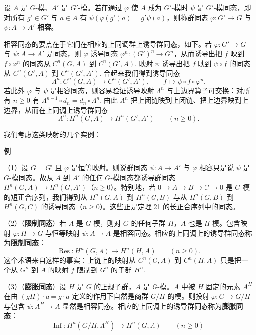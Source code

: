 \begin{definition}
设 \(A\) 是 \(G\)-模、\(A'\) 是 \(G'\)-模。若在通过 \(\varphi\) 使 \(A\) 成为 \(G'\)-模时 \(\psi\) 是 \(G'\)-模同态，即对所有 \(g' \in G'\) 与 \(a \in A\) 有 \(\psi(\varphi(g')a) = g'\psi(a)\)，则称群同态 \(\varphi : G' \to G\) 与 \(\psi : A \to A'\) \textbf{相容}。
\end{definition}

相容同态的要点在于它们在相应的上同调群上诱导群同态，如下。若 \(\varphi : G' \to G\) 与 \(\psi : A \to A'\) 是同态，则 \(\varphi\) 诱导同态 \(\varphi^n : (G')^n \to G^n\)，从而诱导出把 \(f\) 映到 \(f \circ \varphi^n\) 的同态从 \(C^n(G, A)\) 到 \(C^n(G', A)\). 映射 \(\psi\) 诱导出把 \(f\) 映到 \(\psi \circ f\) 的同态从 \(C^n(G', A)\) 到 \(C^n(G', A')\). 合起来我们得到诱导同态
\[
\Lambda^n : C^n(G, A) \to C^n(G', A'), \qquad f \mapsto \psi \circ f \circ \varphi^n.
\]
若此外 \(\varphi\) 与 \(\psi\) 是相容同态，则容易验证诱导映射 \(\Lambda^n\) 与上边界算子可交换：对所有 \(n \geq 0\) 有 \(\Lambda^{n+1} \circ d_n = d_n \circ \Lambda^n\). 由此 \(\Lambda^n\) 把上闭链映到上闭链、把上边界映到上边界，从而在上同调上诱导群同态
\[
\Lambda^n : H^n(G, A) \to H^n(G', A') \qquad (n \geq 0).
\]

我们考虑这类映射的几个实例：

\noindent\textbf{例}

（1）设 \(G = G'\) 且 \(\varphi\) 是恒等映射。则说群同态 \(\psi : A \to A'\) 与 \(\varphi\) 相容只是说 \(\psi\) 是 \(G\)-模同态。故从 \(A\) 到 \(A'\) 的任何 \(G\)-模同态都诱导群同态 \(H^n(G, A) \to H^n(G, A')\)（\(n \geq 0\)）。特别地，若 \(0 \to A \to B \to C \to 0\) 是 \(G\)-模的短正合序列，我们得到从 \(H^n(G, A)\) 到 \(H^n(G, B)\) 与从 \(H^n(G, B)\) 到 \(H^n(G, C)\) 的诱导同态（\(n \geq 0\)）。这些正是定理 21 的长正合序列中的同态。

（2）（\textbf{限制同态}）若 \(A\) 是 \(G\)-模，则对 \(G\) 的任何子群 \(H\)，\(A\) 也是 \(H\)-模。包含映射 \(\varphi : H \to G\) 与恒等映射 \(\psi : A \to A\) 是相容同态。相应的上同调上的诱导群同态称为\textbf{限制同态}：
\[
\operatorname{Res} : H^n(G, A) \to H^n(H, A) \qquad (n \geq 0).
\]
这个术语来自这样的事实：上链上的映射从 \(C^n(G, A)\) 到 \(C^n(H, A)\) 只是把一个从 \(G^n\) 到 \(A\) 的映射 \(f\) 限制到 \(G^n\) 的子群 \(H^n\).

（3）（\textbf{膨胀同态}）设 \(H\) 是 \(G\) 的正规子群，\(A\) 是 \(G\)-模。\(A\) 中被 \(H\) 固定的元素 \(A^H\) 在由 \((gH) \cdot a = g \cdot a\) 定义的作用下自然是商群 \(G/H\) 的模。则投射 \(\varphi : G \to G/H\) 与包含 \(\psi : A^H \to A\) 显然是相容同态。相应的上同调上的诱导群同态称为\textbf{膨胀同态}：
\[
\operatorname{Inf} : H^n(G/H, A^H) \to H^n(G, A) \qquad (n \geq 0).
\]

